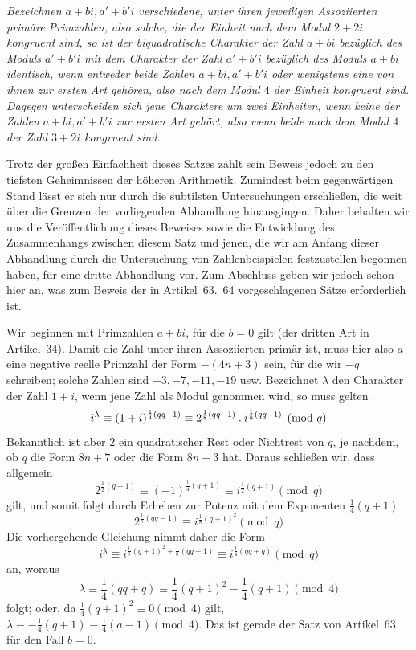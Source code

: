 \emph{Bezeichnen $a+bi,a'+b'i$ verschiedene, unter ihren jeweiligen Assoziierten primäre Primzahlen, also solche, die der Einheit nach dem Modul $2+2i$ kongruent sind, so ist der biquadratische Charakter der Zahl $a+bi$ bezüglich des Moduls $a'+b'i$ mit dem Charakter der Zahl $a'+b'i$ bezüglich des Moduls $a+bi$ identisch, wenn entweder beide Zahlen $a+bi,a'+b'i$ oder wenigstens eine von ihnen zur ersten Art gehören, also nach dem Modul $4$ der Einheit kongruent sind. Dagegen unterscheiden sich jene Charaktere um zwei Einheiten, wenn keine der Zahlen $a+bi,a'+b'i$ zur ersten Art gehört, also wenn beide nach dem Modul $4$ der Zahl $3+2i$ kongruent sind.}

%
Trotz der großen Einfachheit dieses Satzes zählt sein Beweis jedoch zu den tiefsten Geheimnissen der höheren Arithmetik. Zumindest beim gegenwärtigen Stand lässt er sich nur durch die subtilsten Untersuchungen erschließen, die weit über die Grenzen der vorliegenden Abhandlung hinausgingen. Daher behalten wir uns die Veröffentlichung dieses Beweises sowie die Entwicklung des Zusammenhangs zwischen diesem Satz und jenen, die wir am Anfang dieser Abhandlung durch die Untersuchung von Zahlenbeispielen festzustellen begonnen haben, für eine dritte Abhandlung vor. Zum Abschluss geben wir jedoch schon hier an, was zum Beweis der in Artikel~63.~64 vorgeschlagenen Sätze erforderlich ist.

Wir beginnen mit Primzahlen $a+bi$, für die $b=0$ gilt (der dritten Art in Artikel~34). Damit die Zahl unter ihren Assoziierten primär ist, muss hier also $a$ eine negative reelle Primzahl der Form $-(4n+3)$ sein, für die wir $-q$ schreiben; solche Zahlen sind $-3,-7,-11,-19$ usw. Bezeichnet $\lambda$ den Charakter der Zahl $1+i$, wenn jene Zahl als Modul genommen wird, so muss gelten
\[
i^\lambda\equiv(1+i)^{\frac14(qq-1)}\equiv2^{\frac18(qq-1)}\mathbin{.} i^{\frac18(qq-1)}\pmod q
\]
Bekanntlich ist aber $2$ ein quadratischer Rest oder Nichtrest von $q$, je nachdem, ob $q$ die Form $8n+7$ oder die Form $8n+3$ hat. Daraus schließen wir, dass allgemein
\[
2^{\frac12(q-1)}\equiv(-1)^{\frac14(q+1)}\equiv i^{\frac12(q+1)}\pmod q
\]
gilt, und somit folgt durch Erheben zur Potenz mit dem Exponenten $\frac14(q+1)$
\[
2^{\frac18(qq-1)}\equiv i^{\frac18(q+1)^2}\pmod q
\]
Die vorhergehende Gleichung nimmt daher die Form
\[
i^\lambda\equiv i^{\frac18(q+1)^2+\frac18(qq-1)}\equiv i^{\frac14(qq+q)}\pmod q
\]
an, woraus
\[
\lambda\equiv\frac14(qq+q)\equiv\frac14(q+1)^2-\frac14(q+1)\pmod4
\]
folgt; oder, da $\frac14(q+1)^2\equiv0\pmod4$ gilt, $\lambda\equiv-\frac14(q+1)\equiv\frac14(a-1)\pmod4$. Das ist gerade der Satz von Artikel~63 für den Fall $b=0$.

%
